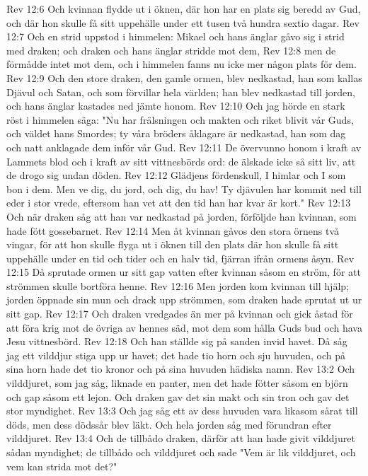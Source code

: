 Rev 12:6  Och kvinnan flydde ut i öknen, där hon har en plats sig beredd av Gud, och där hon skulle få sitt uppehälle under ett tusen två hundra sextio dagar.
Rev 12:7  Och en strid uppstod i himmelen: Mikael och hans änglar gåvo sig i strid med draken; och draken och hans änglar stridde mot dem,
Rev 12:8  men de förmådde intet mot dem, och i himmelen fanns nu icke mer någon plats för dem.
Rev 12:9  Och den store draken, den gamle ormen, blev nedkastad, han som kallas Djävul och Satan, och som förvillar hela världen; han blev nedkastad till jorden, och hans änglar kastades ned jämte honom.
Rev 12:10  Och jag hörde en stark röst i himmelen säga: "Nu har frälsningen och makten och riket blivit vår Guds, och väldet hans Smordes; ty våra bröders åklagare är nedkastad, han som dag och natt anklagade dem inför vår Gud.
Rev 12:11  De övervunno honom i kraft av Lammets blod och i kraft av sitt vittnesbörds ord: de älskade icke så sitt liv, att de drogo sig undan döden.
Rev 12:12  Glädjens fördenskull, I himlar och I som bon i dem. Men ve dig, du jord, och dig, du hav! Ty djävulen har kommit ned till eder i stor vrede, eftersom han vet att den tid han har kvar är kort."
Rev 12:13  Och när draken såg att han var nedkastad på jorden, förföljde han kvinnan, som hade fött gossebarnet.
Rev 12:14  Men åt kvinnan gåvos den stora örnens två vingar, för att hon skulle flyga ut i öknen till den plats där hon skulle få sitt uppehälle under en tid och tider och en halv tid, fjärran ifrån ormens åsyn.
Rev 12:15  Då sprutade ormen ur sitt gap vatten efter kvinnan såsom en ström, för att strömmen skulle bortföra henne.
Rev 12:16  Men jorden kom kvinnan till hjälp; jorden öppnade sin mun och drack upp strömmen, som draken hade sprutat ut ur sitt gap.
Rev 12:17  Och draken vredgades än mer på kvinnan och gick åstad för att föra krig mot de övriga av hennes säd, mot dem som hålla Guds bud och hava Jesu vittnesbörd.
Rev 12:18  Och han ställde sig på sanden invid havet. Då såg jag ett vilddjur stiga upp ur havet; det hade tio horn och sju huvuden, och på sina horn hade det tio kronor och på sina huvuden hädiska namn.
Rev 13:2  Och vilddjuret, som jag såg, liknade en panter, men det hade fötter såsom en björn och gap såsom ett lejon. Och draken gav det sin makt och sin tron och gav det stor myndighet.
Rev 13:3  Och jag såg ett av dess huvuden vara likasom sårat till döds, men dess dödssår blev läkt. Och hela jorden såg med förundran efter vilddjuret.
Rev 13:4  Och de tillbådo draken, därför att han hade givit vilddjuret sådan myndighet; de tillbådo och vilddjuret och sade "Vem är lik vilddjuret, och vem kan strida mot det?"

